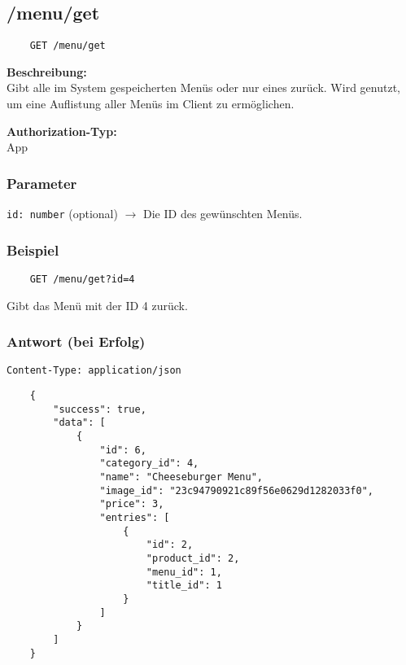 \subsection{/menu/get}

\begin{lstlisting}
    GET /menu/get
\end{lstlisting}

\textbf{Beschreibung:} \\
Gibt alle im System gespeicherten Menüs oder nur eines zurück. Wird genutzt, um eine Auflistung aller Menüs im Client zu ermöglichen.

\textbf{Authorization-Typ:} \\
App

\subsubsection{Parameter}

\lstinline{id: number} (optional)
$\rightarrow$ Die ID des gewünschten Menüs.

\subsubsection{Beispiel}

\begin{lstlisting}
    GET /menu/get?id=4
\end{lstlisting}

Gibt das Menü mit der ID 4 zurück.

\subsubsection{Antwort (bei Erfolg)}

\lstinline{Content-Type: application/json}
\begin{lstlisting}
    {
        "success": true, 
        "data": [
            {
                "id": 6,
                "category_id": 4,
                "name": "Cheeseburger Menu",
                "image_id": "23c94790921c89f56e0629d1282033f0",
                "price": 3,
                "entries": [
                    {
                        "id": 2,
                        "product_id": 2,
                        "menu_id": 1,
                        "title_id": 1
                    }
                ]
            }
        ]
    }
\end{lstlisting}
